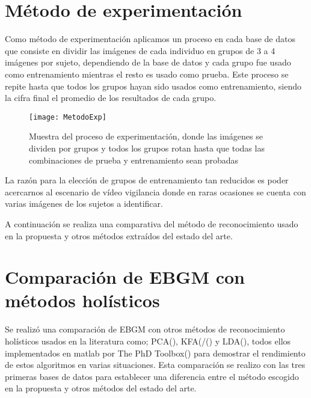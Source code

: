 \section{Método de experimentación}\label{scc:MetdoEx}
Como método de experimentación aplicamos un proceso en cada base de datos que consiste en dividir las imágenes de cada individuo en grupos de 3 a 4 imágenes por sujeto, dependiendo de la base de datos y cada grupo fue usado como entrenamiento mientras el resto es usado como prueba. Este proceso se repite hasta que todos los grupos hayan sido usados como entrenamiento, siendo la cifra final el promedio de los resultados de cada grupo.

\begin{figure}[h]
	\centering
	\texttt{[image: MetodoExp]}
    \caption{Muestra del proceso de experimentación, donde las imágenes se dividen por grupos y todos los grupos rotan hasta que todas las combinaciones de prueba y entrenamiento sean probadas}
    \label{metodo}
\end{figure}

La razón para la elección de grupos de entrenamiento tan reducidos es poder acercarnos al escenario de vídeo vigilancia donde en raras ocasiones se cuenta con varias imágenes de los sujetos a identificar.

A continuación se realiza una comparativa del método de reconocimiento usado en la propuesta y otros métodos extraídos del estado del arte.

\section{Comparación de \ac{EBGM} con métodos holísticos}\label{scc:Comparacion}
Se realizó una comparación de \ac{EBGM} con otros métodos de reconocimiento holísticos usados en la literatura como; \ac{PCA}(\cite{turk1991eigenfaces}), \ac{KFA}(/(\cite{yang2002kernel}) y \ac{LDA}(\cite{zhao1999subspace}), todos ellos implementados en matlab por The PhD Toolbox(\cite{struc2012phd}) para demostrar el rendimiento de estos algoritmos en varias situaciones. Esta comparación se realizo con las tres primeras bases de datos para establecer una diferencia entre el método escogido en la propuesta y otros métodos del estado del arte.

